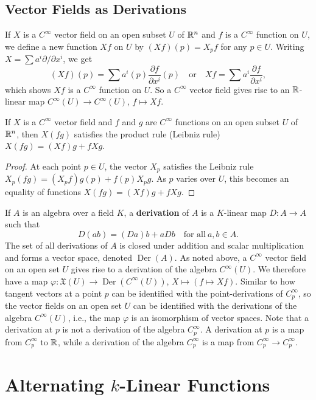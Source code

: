 \subsection{Vector Fields as Derivations}
If $X$ is a $C^{\infty}$ vector field on an open subset $U$ of $\mathbb{R}^n $ and $f$ is a $C^{\infty}$ function on $U$, we define a new function $Xf$ on $U$ by $(Xf)(p)=X_pf$ for any $p\in U$. Writing $X=\sum a^i  \partial /\partial x^i $, we get \[
    (Xf)(p)=\sum a^i (p) \frac{\partial f}{\partial x^i }(p) \quad \text{or} \quad Xf=\sum a^i  \frac{\partial f}{\partial x^i },
\] which shows $Xf$ is a $C^{\infty}$ function on $U$. So a $C^{\infty}$ vector field gives rise to an $\mathbb{R}$-linear map $C^{\infty}(U)\to C^{\infty}(U)$, $f\mapsto Xf$.
\begin{prop}
    If $X$ is a $C^{\infty}$ vector field and $f$ and $g$ are $C^{\infty}$ functions on an open subset $U$ of $\mathbb{R}^n $, then $X(fg)$ satisfies the product rule (Leibniz rule) $X(fg)=(Xf)g+fXg$.
\end{prop}
\begin{proof}
    At each point $p \in U$, the vector $X_p$ satisfies the Leibniz rule $X_p(fg)=(X_pf)g(p)+f(p)X_pg$. As $p$ varies over $U$, this becomes an equality of functions $X(fg)=(Xf)g+fXg$.
\end{proof}
If $A$ is an algebra over a field $K$, a \textbf{derivation} of $A$ is a $K$-linear map $D \colon A \to A$ such that \[
    D(ab)=(Da)b+aDb \quad \text{for all} \ a,b\in A.
\] The set of all derivations of $A$ is closed under addition and scalar multiplication and forms a vector space, denoted $\operatorname{Der}(A)$. As noted above, a $C^{\infty}$ vector field on an open set $U$ gives rise to a derivation of the algebra $C^{\infty}(U)$. We therefore have a map $\varphi \colon \mathfrak X(U) \to \operatorname{Der}(C^{\infty}(U))$, $X\mapsto (f\mapsto Xf)$. Similar to how tangent vectors at a point $p$ can be identified with the point-derivations of $C_p^{\infty}$, so the vector fields on an open set $U$ can be identified with the derivations of the algebra $C^{\infty}(U)$, i.e., the map $\varphi $ is an isomorphism of vector spaces. Note that a derivation at $p$ is not a derivation of the algebra $C_p^{\infty}$. A derivation at $p$ is a map from $C_p^{\infty}$ to $\mathbb{R}$, while a derivation of the algebra $C_p^{\infty}$ is a map from $C_p^{\infty}\to C_p^{\infty}$.

\section{Alternating $k$-Linear Functions}
